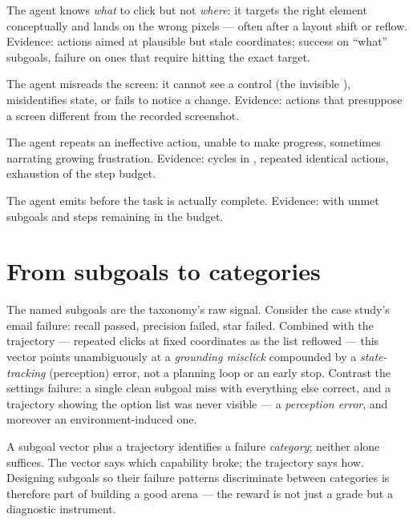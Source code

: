 \documentclass[11pt,openany]{book}
\newcommand{\code}[1]{\textcolor{clayd}{\texttt{\detokenize{#1}}}}
\begin{document}
\begin{description}[leftmargin=0pt,itemsep=5pt,font=\normalfont\bfseries\color{clayd}]
\item[Grounding misclick.] The agent knows \emph{what} to click but not
\emph{where}: it targets the right element conceptually and lands on the wrong
pixels — often after a layout shift or reflow. Evidence: actions aimed at
plausible but stale coordinates; success on ``what'' subgoals, failure on ones
that require hitting the exact target.
\item[Perception error.] The agent misreads the screen: it cannot see a control
(the invisible \code{<select>}), misidentifies state, or fails to notice a change.
Evidence: actions that presuppose a screen different from the recorded screenshot.
\item[Planning loop.] The agent repeats an ineffective action, unable to make
progress, sometimes narrating growing frustration. Evidence: cycles in
\code{actions.jsonl}, repeated identical actions, exhaustion of the step budget.
\item[Premature termination.] The agent emits \code{done} before the task is
actually complete. Evidence: \code{done} with unmet subgoals and steps remaining
in the budget.
\end{description}

\section{From subgoals to categories}

The named subgoals are the taxonomy's raw signal. Consider the case study's email
failure: recall passed, precision failed, star failed. Combined with the
trajectory — repeated clicks at fixed coordinates as the list reflowed — this
vector points unambiguously at a \emph{grounding misclick} compounded by a
\emph{state-tracking} (perception) error, not a planning loop or an early stop.
Contrast the settings failure: a single clean subgoal miss with everything else
correct, and a trajectory showing the option list was never visible — a
\emph{perception error}, and moreover an environment-induced one.

\begin{principle}[.\ ]
A subgoal vector plus a trajectory identifies a failure \emph{category}; neither
alone suffices. The vector says which capability broke; the trajectory says how.
Designing subgoals so their failure patterns discriminate between categories is
therefore part of building a good arena — the reward is not just a grade but a
diagnostic instrument.
\end{principle}
\end{document}
